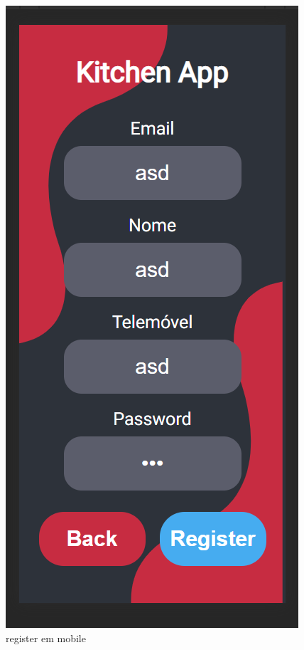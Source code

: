 \documentclass[a4paper]{report}
\begin{document}
\begin{figure}[H]
    \centering 
    \includegraphics[width=\textwidth]{images/generate_mobile.png}  
    \caption{register em mobile}
    \label{fig:register_mobile}
\end{figure}
\end{document}
